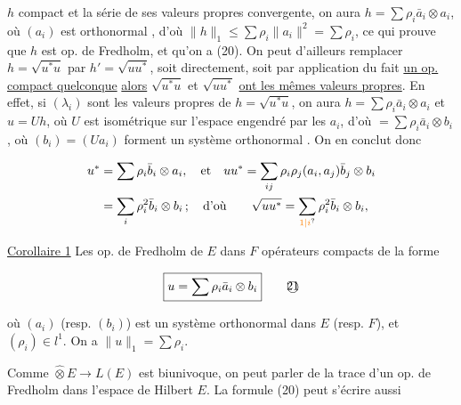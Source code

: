 
$h$ compact et la série  de ses valeurs propres convergente, on aura
$h=\sum\rho_i\bar a_i\otimes a_i$, où $(a_i)$ est orthonormal , d'où
$\|h\|_1\leq\sum\rho_i\|a_i\|^2=\sum\rho_i$, ce qui prouve que $h$ est op. de
Fredholm, et qu'on a (20). On peut d'ailleurs remplacer
 $h=\sqrt{u^*u}$ par $h'=\sqrt{uu^*}$,  soit
directement, soit par application du fait   
 \uline{un op. compact quelconque}  \uline{alors} $\sqrt{u^*u}$ et $\sqrt{uu^*}$
\uline{ont les mêmes valeurs propres}. En effet, si $(\lambda_i)$ sont
les valeurs propres de $h=\sqrt{u^*u}$, on aura $h=\sum\rho_i\bar a_i\otimes a_i$
et $u=Uh$, où $U$ est isométrique sur l'espace engendré
par les $a_i$, d'où $=\sum\rho_i\bar a_i\otimes b_i$, où $(b_i)=(Ua_i)$
forment un système orthonormal . On en conclut donc

\[
\begin{aligned}
u^*&=\sum\rho_i\bar b_i\otimes a_i,\quad\text{et}\quad uu^*=\sum_{ij}\rho_i\rho_j(a_i,a_j)\bar b_j\otimes b_i\\
&=\sum_i\rho_i^2\bar b_i\otimes b_i\,;\quad\text{d'où}\qquad
\sqrt{uu^*}=\sum_{\unsure{1|i}}\rho_i^2\bar b_i\otimes b_i,
\end{aligned}
\]

\uline{Corollaire 1} Les op. de Fredholm de $E$ dans $F$  
opérateurs compacts de la forme

\[
\boxed{u=\sum\rho_i\bar a_i\otimes b_i} \tag*{\textcircled{21}}
\]

où $(a_i)$ (resp. $(b_i)$) est un système orthonormal
dans $E$ (resp. $F$), et $(\rho_i)\in l^1$. On a $\|u\|_1=\sum\rho_i$.


Comme $\widehat\otimes E\to L(E)$ est biunivoque, on peut parler
de la trace d'un op. de Fredholm dans l'espace de Hilbert $E$.
 La formule (20) peut s'écrire aussi

